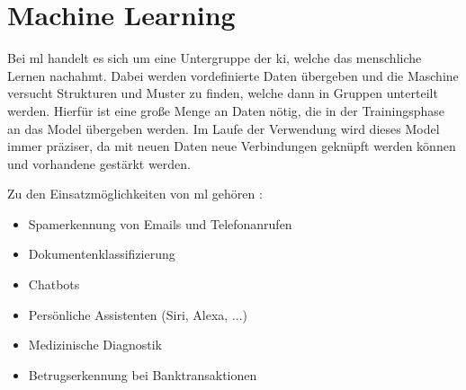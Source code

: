 \section{Machine Learning}

Bei \gls{ml} handelt es sich um eine Untergruppe der \gls{ki}, welche das menschliche Lernen nachahmt. Dabei werden vordefinierte Daten übergeben und die Maschine versucht Strukturen und Muster zu finden, welche dann in Gruppen unterteilt werden. Hierfür ist eine große Menge an Daten nötig, die in der Trainingsphase an das Model übergeben werden. Im Laufe der Verwendung wird dieses Model immer präziser, da mit neuen Daten neue Verbindungen geknüpft werden können und vorhandene gestärkt werden.

Zu den Einsatzmöglichkeiten von \gls{ml} gehören \cite{MLU}:

\begin{itemize}
    \item Spamerkennung von Emails und Telefonanrufen
    \item Dokumentenklassifizierung
    \item Chatbots
    \item Persönliche Assistenten (Siri, Alexa, ...)
    \item Medizinische Diagnostik
    \item Betrugserkennung bei Banktransaktionen
\end{itemize}







